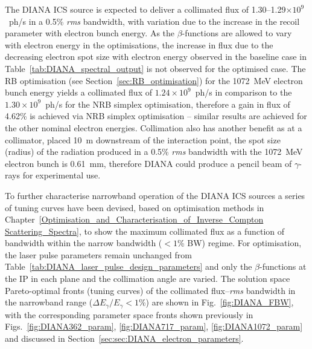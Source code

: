 \documentclass[../main.tex]{subfiles}
\begin{document}
The DIANA ICS source is expected to deliver a collimated flux of 1.30--1.29$\times 10^{9}$~ph/\si{\second} in a 0.5\% \textit{rms} bandwidth, with variation due to the increase in the recoil parameter with electron bunch energy. As the $\beta$-functions are allowed to vary with electron energy in the optimisations, the increase in flux due to the decreasing electron spot size with electron energy observed in the baseline case in Table~\ref{tab:DIANA_spectral_output} is not observed for the optimised case. The RB optimisation (see Section~\ref{sec:RB_optimisation}) for the 1072~\si{\mega\electronvolt} electron bunch energy yields a collimated flux of $1.24\times 10^{9}$~ph/\si{\second} in comparison to the $1.30\times 10^{9}$~ph/\si{\second} for the NRB simplex optimisation, therefore a gain in flux of 4.62\% is achieved via NRB simplex optimisation -- similar results are achieved for the other nominal electron energies.
Collimation also has another benefit as at a collimator, placed 10~\si{\meter} downstream of the interaction point, the spot size (radius) of the radiation produced in a 0.5\% \textit{rms} bandwidth with the 1072~\si{\mega\electronvolt} electron bunch is 0.61~\si{\milli\meter}, therefore DIANA could produce a pencil beam of $\gamma$-rays for experimental use.

To further characterise narrowband operation of the DIANA ICS sources a series of tuning curves have been devised, based on optimisation methods in Chapter~\ref{Optimisation_and_Characterisation_of_Inverse_Compton Scattering_Spectra}, to show the maximum collimated flux as a function of bandwidth within the narrow bandwidth ($<1$\%  BW) regime. For optimisation, the laser pulse parameters remain unchanged from Table~\ref{tab:DIANA_laser_pulse_design_parameters} and only the $\beta$-functions at the IP in each plane and the collimation angle are varied. The solution space Pareto-optimal fronts (tuning curves) of the collimated flux--\textit{rms} bandwidth in the narrowband range ($\Delta E_{\gamma}/E_{\gamma} < 1$\%) are shown in Fig.~\ref{fig:DIANA_FBW}, with the corresponding parameter space fronts shown previously in Figs.~\ref{fig:DIANA362_param}, \ref{fig:DIANA717_param}, \ref{fig:DIANA1072_param} and discussed in Section~\ref{sec:sec:DIANA_electron_parameters}.  
\end{document}
